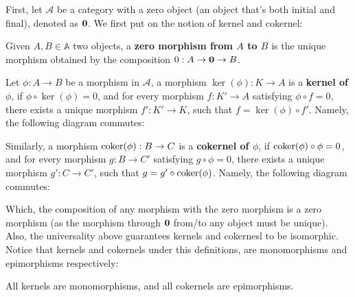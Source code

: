 \documentclass{article}
\begin{document}
First, let $\mathcal{A}$ be a category with a zero object (an object that's both initial and final), denoted as $\mathbf{0}$. We first put on the notion of kernel and cokernel:
\begin{defn}
    Given $A,B\in\mathbb{A}$ two objects, a \textbf{zero morphism from $A$ to $B$} is the unique morphism obtained by the composition $0:A\rightarrow\mathbf{0}\rightarrow B$.
    
    \hfil

    Let $\phi:A\rightarrow B$ be a morphism in $\mathcal{A}$, a morphism $\ker(\phi):K\rightarrow A$ is a \textbf{kernel of $\phi$}, if $\phi\circ \ker(\phi)=0$, and for every morphism $f:K'\rightarrow A$ satisfying $\phi\circ f=0$, there exists a unique morphism $f':K'\rightarrow K$, such that $f = \ker(\phi)\circ f'$. Namely, the following diagram commutes:
    \begin{center}
    \end{center}
    \hfil

    Similarly, a morphism $\mathrm{coker}(\phi):B\rightarrow C$ is a \textbf{cokernel of $\phi$}, if $\mathrm{coker}(\phi)\circ \phi=0$, and for every morphism $g:B\rightarrow C'$ satisfying $g \circ\phi=0$, there exists a unique morphism $g':C\rightarrow C'$, such that $g = g'\circ \mathrm{coker}(\phi)$. Namely, the following diagram commutes:
    \begin{center}
    \end{center}
\end{defn}
Which, the composition of any morphism with the zero morphism is a zero morphism (as the morphism through $\mathbf{0}$ from/to any object must be unique). Also, the universality above guarantees kernels and cokernesl to be isomorphic. Notice that kernels and cokernels under this definitions, are monomorphisms and epimorphisms respectively:
\begin{prop}
    All kernels are monomorphisms, and all cokernels are epimorphisms.
\end{prop}
\end{document}
